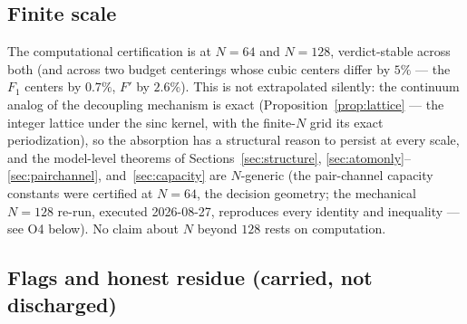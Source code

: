 \documentclass[11pt]{article}
\theoremstyle{plain}
\theoremstyle{definition}
\theoremstyle{remark}
\begin{document}
\subsection{Finite scale}

The computational certification is at $N = 64$ and $N = 128$, verdict-stable
across both (and across two budget centerings whose cubic centers differ by
$5\%$ --- the $F_1$ centers by $0.7\%$, $F'$ by $2.6\%$). This is not
extrapolated silently: the continuum analog of the decoupling mechanism is exact
(Proposition~\ref{prop:lattice} --- the integer lattice under the sinc kernel,
with the finite-$N$ grid its exact periodization), so the absorption has a
structural reason to persist at every scale, and the model-level theorems of
Sections~\ref{sec:structure},
\ref{sec:atomonly}--\ref{sec:pairchannel}, and~\ref{sec:capacity} are
$N$-generic (the pair-channel capacity constants were certified at $N = 64$, the
decision geometry; the mechanical $N = 128$ re-run, executed 2026-08-27,
reproduces every identity and inequality --- see O4 below). No claim about $N$
beyond $128$ rests on computation.

\subsection{Flags and honest residue (carried, not discharged)}
\label{sec:flags}
\end{document}
